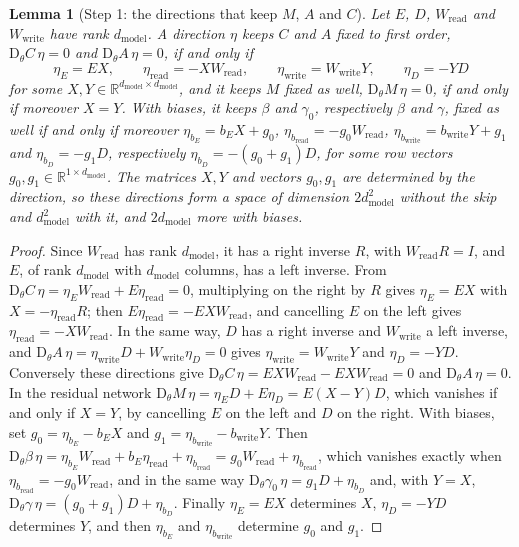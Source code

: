 \documentclass[10pt]{article}
\newtheorem{lemma}[theorem]{Lemma}
\theoremstyle{definition}
\theoremstyle{remark}
\newcommand{\R}{\mathbb{R}}
\newcommand{\Wread}{W_{\mathrm{read}}}
\newcommand{\Wwrite}{W_{\mathrm{write}}}
\newcommand{\dm}{d_{\mathrm{model}}}
\newcommand{\Der}{\mathrm{D}}
\begin{document}
\begin{lemma}[Step 1: the directions that keep $M$, $A$ and $C$]\label{lem:fact}
Let $E$, $D$, $\Wread$ and $\Wwrite$ have rank $\dm$. A direction $\eta$ keeps $C$ and $A$ fixed to first order, $\Der_\theta C\,\eta = 0$ and $\Der_\theta A\,\eta = 0$, if and only if
\[
\eta_E = EX,\qquad \eta_{\mathrm{read}} = -X\Wread,\qquad \eta_{\mathrm{write}} = \Wwrite Y,\qquad \eta_D = -YD
\]
for some $X, Y \in \R^{\dm\times\dm}$, and it keeps $M$ fixed as well, $\Der_\theta M\,\eta = 0$, if and only if moreover $X = Y$. With biases, it keeps $\beta$ and $\gamma_0$, respectively $\beta$ and $\gamma$, fixed as well if and only if moreover $\eta_{b_E} = b_EX + g_0$, $\eta_{b_{\mathrm{read}}} = -g_0\Wread$, $\eta_{b_{\mathrm{write}}} = b_{\mathrm{write}}Y + g_1$ and $\eta_{b_D} = -g_1D$, respectively $\eta_{b_D} = -(g_0 + g_1)D$, for some row vectors $g_0, g_1 \in \R^{1\times\dm}$. The matrices $X, Y$ and vectors $g_0, g_1$ are determined by the direction, so these directions form a space of dimension $2\dm^2$ without the skip and $\dm^2$ with it, and $2\dm$ more with biases.
\end{lemma}

\begin{proof}
Since $\Wread$ has rank $\dm$, it has a right inverse $R$, with $\Wread R = I$, and $E$, of rank $\dm$ with $\dm$ columns, has a left inverse. From $\Der_\theta C\,\eta = \eta_E\Wread + E\eta_{\mathrm{read}} = 0$, multiplying on the right by $R$ gives $\eta_E = EX$ with $X = -\eta_{\mathrm{read}}R$; then $E\eta_{\mathrm{read}} = -EX\Wread$, and cancelling $E$ on the left gives $\eta_{\mathrm{read}} = -X\Wread$. In the same way, $D$ has a right inverse and $\Wwrite$ a left inverse, and $\Der_\theta A\,\eta = \eta_{\mathrm{write}}D + \Wwrite\eta_D = 0$ gives $\eta_{\mathrm{write}} = \Wwrite Y$ and $\eta_D = -YD$. Conversely these directions give $\Der_\theta C\,\eta = EX\Wread - EX\Wread = 0$ and $\Der_\theta A\,\eta = 0$. In the residual network $\Der_\theta M\,\eta = \eta_ED + E\eta_D = E(X - Y)D$, which vanishes if and only if $X = Y$, by cancelling $E$ on the left and $D$ on the right. With biases, set $g_0 = \eta_{b_E} - b_EX$ and $g_1 = \eta_{b_{\mathrm{write}}} - b_{\mathrm{write}}Y$. Then $\Der_\theta\beta\,\eta = \eta_{b_E}\Wread + b_E\eta_{\mathrm{read}} + \eta_{b_{\mathrm{read}}} = g_0\Wread + \eta_{b_{\mathrm{read}}}$, which vanishes exactly when $\eta_{b_{\mathrm{read}}} = -g_0\Wread$, and in the same way $\Der_\theta\gamma_0\,\eta = g_1D + \eta_{b_D}$ and, with $Y = X$, $\Der_\theta\gamma\,\eta = (g_0 + g_1)D + \eta_{b_D}$. Finally $\eta_E = EX$ determines $X$, $\eta_D = -YD$ determines $Y$, and then $\eta_{b_E}$ and $\eta_{b_{\mathrm{write}}}$ determine $g_0$ and $g_1$.
\end{proof}
\end{document}
